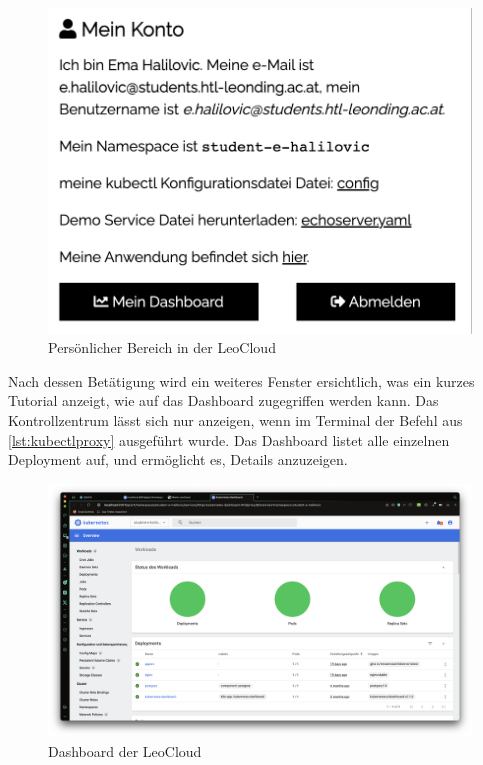 \begin{figure}
    \centering
    \includegraphics[scale=0.5]{pics/leowikimeinkonto.png}
    \caption{Persönlicher Bereich in der LeoCloud}
    \label{fig:implementation:meinkonto}
\end{figure}

Nach dessen Betätigung wird ein weiteres Fenster ersichtlich, was ein kurzes Tutorial anzeigt, wie auf das Dashboard zugegriffen werden kann. 
Das Kontrollzentrum lässt sich nur anzeigen, wenn im Terminal der Befehl aus \ref{lst:kubectlproxy} ausgeführt wurde. 
Das Dashboard listet alle einzelnen Deployment auf, und ermöglicht es, Details anzuzeigen.

\begin{figure}
  \centering
  \includegraphics[scale=0.2]{pics/kubernetes_dashboard.png}
  \caption{Dashboard der LeoCloud}
  \label{fig:implementation:dashboard_cloud}
\end{figure}

